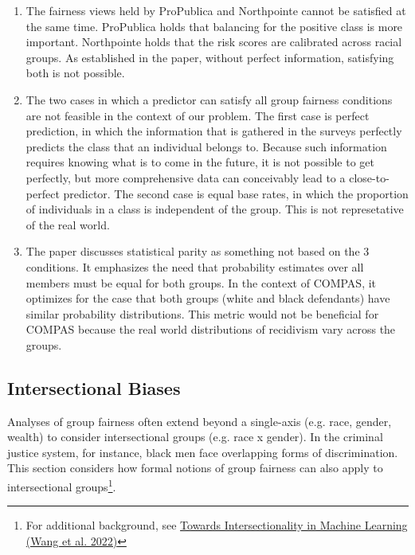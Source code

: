 \documentclass{article}
\begin{document}
\bigskip
\begin{mdframed}
\begin{enumerate}[label=\Alph*.]
\item The fairness views held by ProPublica and Northpointe cannot be satisfied at the same time. ProPublica holds that balancing for the positive class is more important. Northpointe holds that the risk scores are calibrated across racial groups. As established in the paper, without perfect information, satisfying both is not possible. 
\item The two cases in which a predictor can satisfy all group fairness conditions are not feasible in the context of our problem. The first case is perfect prediction, in which the information that is gathered in the surveys perfectly predicts the class that an individual belongs to. Because such information requires knowing what is to come in the future, it is not possible to get perfectly, but more comprehensive data can conceivably lead to a close-to-perfect predictor. The second case is equal base rates, in which the proportion of individuals in a class is independent of the group. This is not represetative of the real world.
\item The paper discusses statistical parity as something not based on the 3 conditions. It emphasizes the need that probability estimates over all members must be equal for both groups. In the context of COMPAS, it optimizes for the case that both groups (white and black defendants) have similar probability distributions. This metric would not be beneficial for COMPAS because the real world distributions of recidivism vary across the groups. 
\end{enumerate}
\end{mdframed}
\bigskip






\subsection*{Intersectional Biases}

Analyses of group fairness often extend beyond a single-axis (e.g. race, gender, wealth) to consider intersectional groups (e.g. race x gender). In the criminal justice system, for instance, black men face overlapping forms of discrimination. This section considers how formal notions of group fairness can also apply to intersectional groups\footnote{For additional background, see \href{https://dl.acm.org/doi/pdf/10.1145/3531146.3533101}{Towards Intersectionality in Machine Learning (Wang et al. 2022)}}. 
\end{document}
